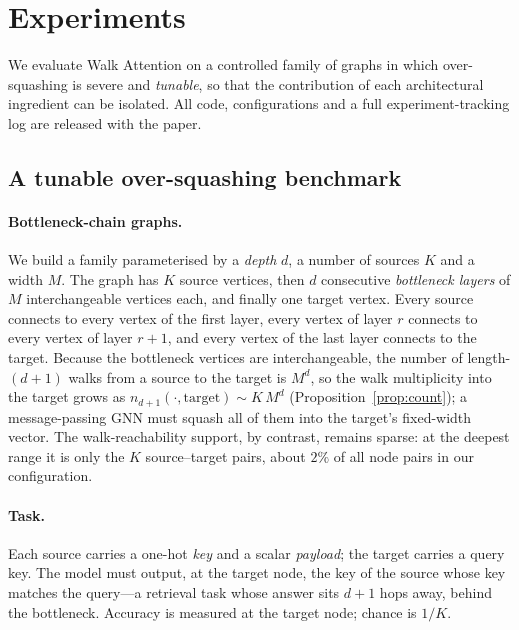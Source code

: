 \section{Experiments}\label{sec:exp}

We evaluate Walk Attention on a controlled family of graphs in which
over-squashing is severe and \emph{tunable}, so that the contribution of each
architectural ingredient can be isolated. All code, configurations and a full
experiment-tracking log are released with the paper.

\subsection{A tunable over-squashing benchmark}

\paragraph{Bottleneck-chain graphs.}
We build a family parameterised by a \emph{depth} $d$, a number of sources $K$
and a width $M$. The graph has $K$ source vertices, then $d$ consecutive
\emph{bottleneck layers} of $M$ interchangeable vertices each, and finally one
target vertex. Every source connects to every vertex of the first layer, every
vertex of layer $r$ connects to every vertex of layer $r+1$, and every vertex of
the last layer connects to the target. Because the bottleneck vertices are
interchangeable, the number of length-$(d{+}1)$ walks from a source to the target
is $M^{d}$, so the walk multiplicity into the target grows as
$n_{d+1}(\cdot,\text{target})\sim K\,M^{d}$
(Proposition~\ref{prop:count}); a message-passing GNN must squash all of them
into the target's fixed-width vector. The walk-reachability support, by contrast,
remains sparse: at the deepest range it is only the $K$ source--target pairs,
about $2\%$ of all node pairs in our configuration.

\paragraph{Task.}
Each source carries a one-hot \emph{key} and a scalar \emph{payload}; the target
carries a query key. The model must output, at the target node, the key of the
source whose key matches the query---a retrieval task whose answer sits $d{+}1$
hops away, behind the bottleneck. Accuracy is measured at the target node;
chance is $1/K$.

